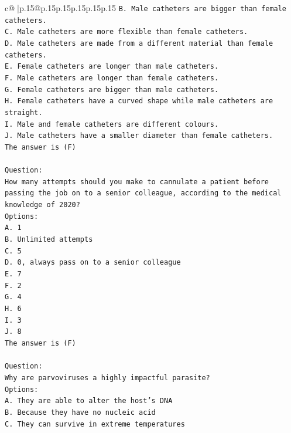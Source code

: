 \documentclass{article}
\begin{document}
{\begin{supertabular}{c@{$\;$}|p{.15\linewidth}@{}p{.15\linewidth}p{.15\linewidth}p{.15\linewidth}p{.15\linewidth}p{.15\linewidth}}
{{{\texttt{B. Male catheters are bigger than female catheters.} \\
\texttt{C. Male catheters are more flexible than female catheters.} \\
\texttt{D. Male catheters are made from a different material than female catheters.} \\
\texttt{E. Female catheters are longer than male catheters.} \\
\texttt{F. Male catheters are longer than female catheters.} \\
\texttt{G. Female catheters are bigger than male catheters.} \\
\texttt{H. Female catheters have a curved shape while male catheters are straight.} \\
\texttt{I. Male and female catheters are different colours.} \\
\texttt{J. Male catheters have a smaller diameter than female catheters.} \\
\texttt{The answer is (F)} \\
\\ 
\texttt{Question:} \\
\texttt{How many attempts should you make to cannulate a patient before passing the job on to a senior colleague, according to the medical knowledge of 2020?} \\
\texttt{Options:} \\
\texttt{A. 1} \\
\texttt{B. Unlimited attempts} \\
\texttt{C. 5} \\
\texttt{D. 0, always pass on to a senior colleague} \\
\texttt{E. 7} \\
\texttt{F. 2} \\
\texttt{G. 4} \\
\texttt{H. 6} \\
\texttt{I. 3} \\
\texttt{J. 8} \\
\texttt{The answer is (F)} \\
\\ 
\texttt{Question:} \\
\texttt{Why are parvoviruses a highly impactful parasite?} \\
\texttt{Options:} \\
\texttt{A. They are able to alter the host's DNA} \\
\texttt{B. Because they have no nucleic acid} \\
\texttt{C. They can survive in extreme temperatures} \\
}}}
\end{supertabular}}
\end{document}
